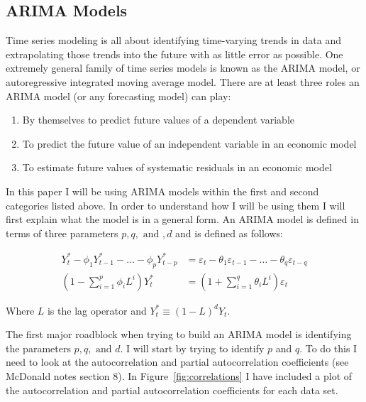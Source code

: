 \documentclass[a4paper, 11pt]{article}
\newcommand\ve{\varepsilon} %
\theoremstyle{definition} %
\numberwithin{equation}{section}
\begin{document}
  \newpage
  \subsection{ARIMA Models} \label{sub:arima}

    Time series modeling is all about identifying time-varying trends in data and extrapolating those trends into the future with as little error as possible. One extremely general family of time series models is known as the ARIMA model, or autoregressive integrated moving average model. There are at least three roles an ARIMA model (or any forecasting model) can play:

    \begin{enumerate}
      \item By themselves to predict future values of a dependent variable
      \item To predict the future value of an independent variable in an economic model
      \item To estimate future values of systematic residuals in an economic model
    \end{enumerate}

    In this paper I will be using ARIMA models within the first and second categories listed above. In order to understand how I will be using them I will first explain what the model is in a general form. An ARIMA model is defined in terms of three parameters $p, q, \text{ and }, d$ and is defined as follows:

     \begin{align}
     Y_t^* - \phi_1Y_{t-1}^*  - \dots - \phi_pY_{t-p}^* &= \ve_t - \theta_1\ve_{t-1} - \dots - \theta_q \ve_{t-q} \label{eq:arimalong}\\
     \left( 1 - \sum_{i=1}^p \phi_i L^i\right) Y_t^* &= \left( 1 + \sum_{i=1} ^q \theta_i L^i \right) \ve_t \label{eq:arima}
     \end{align}

    Where $L$ is the lag operator and $Y_t^* \equiv (1 - L)^d Y_t$.

    The first major roadblock when trying to build an ARIMA model is identifying the parameters $p, q, \text{ and } d$. I will start by trying to identify $p$ and $q$. To do this I need to look at the autocorrelation and partial autocorrelation coefficients (see McDonald notes section 8). In Figure~\ref{fig:correlations} I have included a plot of the autocorrelation and partial autocorrelation coefficients for each data set.
\end{document}
